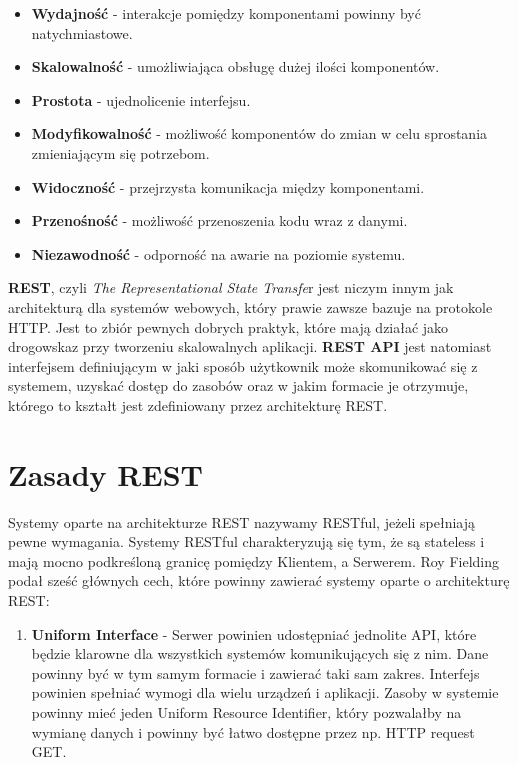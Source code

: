 \documentclass[oneside,polski,logo,indent]{amuthesis}
\begin{document}
\begin{enumerate}
\begin{itemize}
\item \textbf{Wydajność} - interakcje pomiędzy komponentami powinny być natychmiastowe.\newline
\item \textbf{Skalowalność}  - umożliwiająca obsługę dużej ilości komponentów.\newline
\item \textbf{Prostota} - ujednolicenie interfejsu.\newline
\item \textbf{Modyfikowalność}  - możliwość komponentów do zmian w celu sprostania zmieniającym się potrzebom.\newline
\item \textbf{Widoczność}  - przejrzysta komunikacja między komponentami.\newline
\item \textbf{Przenośność} - możliwość przenoszenia kodu wraz z danymi.\newline
\item \textbf{Niezawodność}  - odporność na awarie na poziomie systemu.\newline
\end{itemize}

\textbf{REST}, czyli \emph{The Representational State Transfe}r jest niczym innym jak architekturą dla systemów webowych, który prawie zawsze bazuje na protokole HTTP. Jest to zbiór pewnych dobrych praktyk, które mają działać jako drogowskaz przy tworzeniu skalowalnych aplikacji. \textbf{REST API} jest natomiast interfejsem definiującym w jaki sposób użytkownik może skomunikować się z systemem, uzyskać dostęp do zasobów oraz w jakim formacie je otrzymuje, którego to kształt jest zdefiniowany przez architekturę REST. 

\section{Zasady REST}

Systemy oparte na architekturze REST nazywamy RESTful, jeżeli spełniają pewne wymagania. Systemy RESTful charakteryzują się tym, że są stateless i mają mocno podkreśloną granicę pomiędzy Klientem, a Serwerem. Roy Fielding podał sześć głównych cech, które powinny zawierać systemy oparte o architekturę REST:\newline  

\begin{enumerate}
\item \textbf{Uniform Interface} - Serwer powinien udostępniać jednolite API, które będzie klarowne dla wszystkich systemów komunikujących się z nim. Dane powinny być w tym samym formacie i zawierać taki sam zakres. Interfejs powinien spełniać wymogi dla wielu urządzeń i aplikacji. Zasoby w systemie powinny mieć jeden Uniform Resource Identifier, który pozwalałby na wymianę danych i powinny być łatwo dostępne przez np. HTTP request GET.


\end{enumerate}
\end{enumerate}
\end{document}
